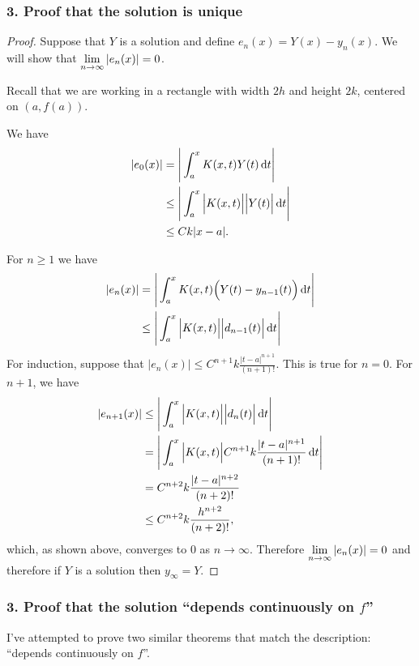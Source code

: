 \documentclass[12pt]{article}
\begin{document}
\subsubsection*{3. Proof that the solution is unique}

\begin{proof}
Suppose that $Y$ is a solution and define $e_n(x) = Y(x) - y_n(x)$. We will
show that $\lim\limits_{n \to \infty} |e_n(x)| = 0$.

Recall that we are working in a rectangle with width $2h$ and height $2k$,
centered on $(a, f(a))$.

We have
\begin{align*}
  |e_0(x)| &=    \Bigg|\int_a^x K(x,t)Y(t) \dt\Bigg|\\
           &\leq \Bigg|\int_a^x \Big|K(x,t)\Big|\Big|Y(t)\Big| \dt\Bigg|\\
           &\leq Ck|x-a|.
\end{align*}

For $n \geq 1$ we have
\begin{align*}
  |e_n(x)| &= \Bigg|\int_a^x K(x,t)\Big(Y(t) - y_{n-1}(t)\Big) \dt\Bigg|\\
           &\leq \Bigg|\int_a^x \Big|K(x,t)\Big|\Big|d_{n-1}(t)\Big|\dt\Bigg|\\
\end{align*}
For induction, suppose that $|e_n(x)| \leq
C^{n+1}k\frac{|t-a|^{n+1}}{(n+1)!}$. This is true for $n=0$. For $n+1$, we have
\begin{align*}
|e_{n+1}(x)| &\leq \Bigg|\int_a^x \Big|K(x,t)\Big|\Big|d_{n}(t)\Big|\dt\Bigg|\\
            &=    \Bigg|\int_a^x \Big|K(x,t)\Big|C^{n+1}k\frac{|t-a|^{n+1}}{(n+1)!}\dt\Bigg|\\
            &=    C^{n+2}k\frac{|t-a|^{n+2}}{(n+2)!}\\
            &\leq C^{n+2}k\frac{h^{n+2}}{(n+2)!},
\end{align*}
which, as shown above, converges to 0 as $n \to \infty$. Therefore
$\lim\limits_{n \to \infty} |e_n(x)| = 0$ and therefore if $Y$ is a solution then $y_\infty = Y$.
\end{proof}

\newpage
\subsubsection*{3. Proof that the solution ``depends continuously on $f$''}

I've attempted to prove two similar theorems that match the description:
``depends continuously on $f$''.
\end{document}
